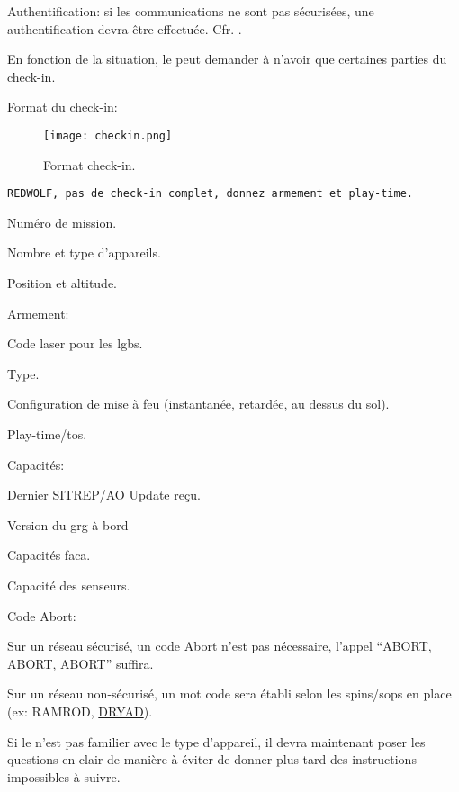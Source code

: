 \begin{e1}
	\item Authentification: si les communications ne sont pas sécurisées, une authentification devra être effectuée. Cfr. .
	
	\item En fonction de la situation, le \ja{} peut demander à n'avoir que certaines parties du check-in.
	
	\begin{minipage}{\linewidth}
		\item Format du check-in:
		\begin{figure}[H]
			\texttt{[image: checkin.png]}
			\caption{Format check-in.}
			\label{fig:checkin}
		\end{figure}	
	\end{minipage}
	
	\begin{minipage}{\linewidth}
		\begin{lstlisting}[caption=Check-in: partiel, label=checkinpart]
	REDWOLF, pas de check-in complet, donnez armement et play-time.
		\end{lstlisting}
	\end{minipage}
	
	\begin{e2}
		\item Numéro de mission.
		\item Nombre et type d'appareils.
		\item Position et altitude.
		\item Armement:
		\begin{e3}
			\item Code laser pour les \glspl{lgb}.
			\item Type.
			\item Configuration de mise à feu (instantanée, retardée, au dessus du sol).
		\end{e3}
		\item Play-time/\gls{tos}.
		\item Capacités:
		\begin{e3}
			\item Dernier SITREP/AO Update reçu.
			\item Version du \gls{grg} à bord
			\item Capacités \gls{faca}.
			\item Capacité des senseurs.
		\end{e3}
		\item Code Abort:
		\begin{e3}
			\item Sur un réseau sécurisé, un code Abort n'est pas nécessaire, l'appel ``ABORT, ABORT, ABORT'' suffira.
			\item Sur un réseau non-sécurisé, un mot code sera établi selon les \gls{spins}/\glspl{sop} en place (ex: RAMROD, \hyperref[dryad]{DRYAD}).
		\end{e3}
		\item Si le \ja{} n'est pas familier avec le type d'appareil, il devra maintenant poser les questions en clair de manière à éviter de donner plus tard des instructions impossibles à suivre.
	\end{e2}
	

\end{e1}
